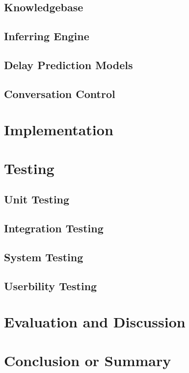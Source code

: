 \documentclass[11pt]{article}
\begin{document}
	\subsection{Knowledgebase}
	
	\subsection{Inferring Engine}
	
	\subsection{Delay Prediction Models}
	
	\subsection{Conversation Control}
	
	
	\section{Implementation}
	
	\section{Testing}
	
	\subsection{Unit Testing}
	
	\subsection{Integration Testing}
	
	\subsection{System Testing}
	
	\subsection{Userbility Testing}
	
	\section{Evaluation and Discussion}
	
	\section{Conclusion or Summary}
	
	
	 
	
\end{document}

